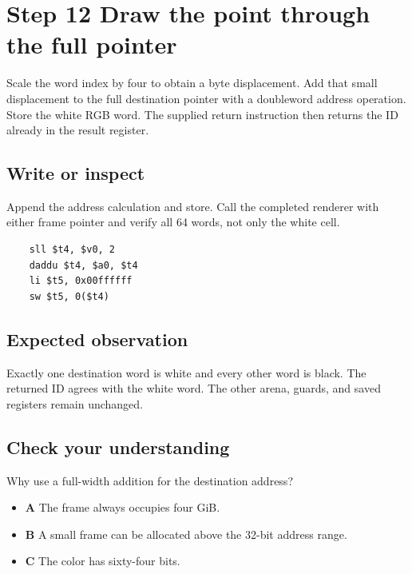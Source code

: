 \section{Step 12 Draw the point through the full pointer}\label{ball-s12}

Scale the word index by four to obtain a byte displacement. Add that small displacement to the full destination pointer with a doubleword address operation. Store the white RGB word. The supplied return instruction then returns the ID already in the result register.

\subsection{Write or inspect}
Append the address calculation and store. Call the completed renderer with either frame pointer and verify all 64 words, not only the white cell.

\begin{verbatim}
    sll $t4, $v0, 2
    daddu $t4, $a0, $t4
    li $t5, 0x00ffffff
    sw $t5, 0($t4)
\end{verbatim}

\subsection{Expected observation}
Exactly one destination word is white and every other word is black. The returned ID agrees with the white word. The other arena, guards, and saved registers remain unchanged.

\subsection{Check your understanding}
Why use a full-width addition for the destination address?

\begin{itemize}
  \item \textbf{A} The frame always occupies four GiB.
  \item \textbf{B} A small frame can be allocated above the 32-bit address range.
  \item \textbf{C} The color has sixty-four bits.
\end{itemize}
